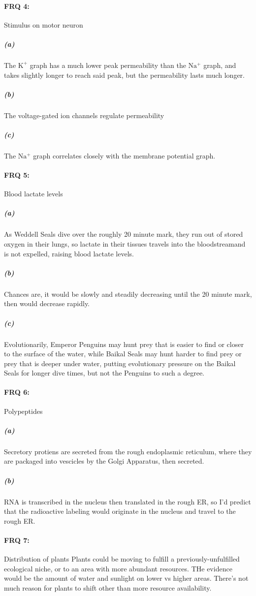 \documentclass[12pt]{article}
\begin{document}
    \paragraph{FRQ 4:} Stimulus on motor neuron
        \subparagraph*{(a)} The $\mathrm{K^+}$ graph has a much lower peak permeability than the $\mathrm{Na^+}$ graph, and takes slightly longer to reach said peak, but the permeability lasts much longer.
        \subparagraph*{(b)} The voltage-gated ion channels regulate permeability
        \subparagraph*{(c)} The $\mathrm{Na^+}$ graph correlates closely with the membrane potential graph.

    \paragraph{FRQ 5:} Blood lactate levels
        \subparagraph*{(a)} As Weddell Seals dive over the roughly 20 minute mark, they run out of stored oxygen in their lungs, so lactate in their tissues travels into the bloodstreamand is not expelled, raising blood lactate levels.
        \subparagraph*{(b)} Chances are, it would be slowly and steadily decreasing until the 20 minute mark, then would decrease rapidly.
        \subparagraph*{(c)} Evolutionarily, Emperor Penguins may hunt prey that is easier to find or closer to the surface of the water, while Baikal Seals may hunt harder to find prey or prey that is deeper under water, putting evolutionary pressure on the Baikal Seals for longer dive times, but not the Penguins to such a degree.

    \paragraph{FRQ 6:} Polypeptides
        \subparagraph*{(a)} Secretory protiens are secreted from the rough endoplasmic reticulum, where they are packaged into vescicles by the Golgi Apparatus, then secreted.
        \subparagraph*{(b)} RNA is transcribed in the nucleus then translated in the rough ER, so I'd predict that the radioactive labeling would originate in the nucleus and travel to the rough ER.

    \paragraph{FRQ 7:} Distribution of plants
        Plants could be moving to fulfill a previously-unfulfilled ecological niche, or to an area with more abundant resources. THe evidence would be the amount of water and sunlight on lower vs higher areas. There's not much reason for plants to shift other than more resource availability.
\end{document}
